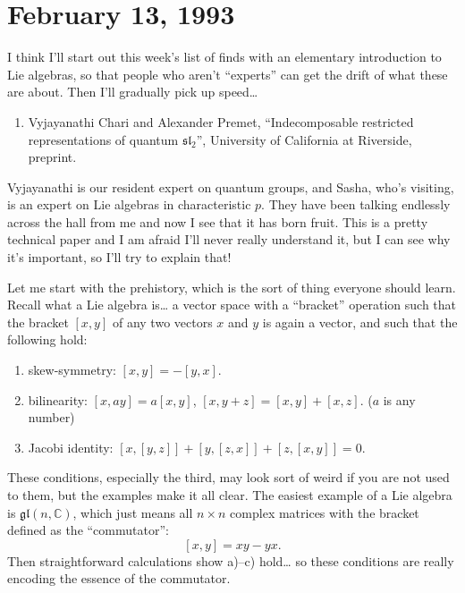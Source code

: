 \documentclass{article}
\def\tightlist{}
\begin{document}
\hypertarget{week5}{%
\section{February 13, 1993}\label{week5}}

I think I'll start out this week's list of finds with an elementary
introduction to Lie algebras, so that people who aren't ``experts'' can
get the drift of what these are about. Then I'll gradually pick up
speed\ldots{}

\begin{enumerate}
\def\labelenumi{\arabic{enumi})}
\tightlist
\item
  Vyjayanathi Chari and Alexander Premet, ``Indecomposable restricted
  representations of quantum \(\mathfrak{sl}_2\)'', University of
  California at Riverside, preprint.
\end{enumerate}

Vyjayanathi is our resident expert on quantum groups, and Sasha, who's
visiting, is an expert on Lie algebras in characteristic \(p\). They
have been talking endlessly across the hall from me and now I see that
it has born fruit. This is a pretty technical paper and I am afraid I'll
never really understand it, but I can see why it's important, so I'll
try to explain that!

Let me start with the prehistory, which is the sort of thing everyone
should learn. Recall what a Lie algebra is\ldots{} a vector space with a
``bracket'' operation such that the bracket \([x,y]\) of any two vectors
\(x\) and \(y\) is again a vector, and such that the following hold:

\begin{enumerate}
\def\labelenumi{\alph{enumi})}
\tightlist
\item
  skew-symmetry: \([x,y] = -[y,x]\).
\item
  bilinearity: \([x,ay] = a[x,y]\), \([x,y+z] = [x,y] + [x,z]\). (\(a\)
  is any number)
\item
  Jacobi identity: \([x,[y,z]] + [y,[z,x]] + [z,[x,y]] = 0\).
\end{enumerate}

These conditions, especially the third, may look sort of weird if you
are not used to them, but the examples make it all clear. The easiest
example of a Lie algebra is \(\mathfrak{gl}(n,\mathbb{C})\), which just
means all \(n\times n\) complex matrices with the bracket defined as the
``commutator'': \[[x,y] = xy-yx.\] Then straightforward calculations
show a)--c) hold\ldots{} so these conditions are really encoding the
essence of the commutator.
\end{document}
